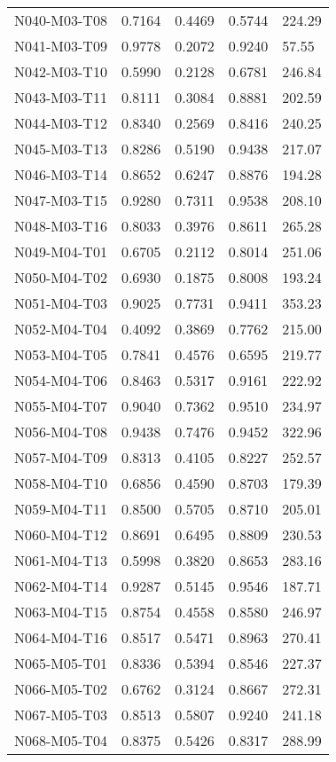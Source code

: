 \begin{longtable}[c]{|p{8cm}|c|l|l|l|}
N040-M03-T08 & 0.7164 & 0.4469 & 0.5744 & 224.29 \\
N041-M03-T09 & 0.9778 & 0.2072 & 0.9240 & 57.55 \\
N042-M03-T10 & 0.5990 & 0.2128 & 0.6781 & 246.84 \\
N043-M03-T11 & 0.8111 & 0.3084 & 0.8881 & 202.59 \\
N044-M03-T12 & 0.8340 & 0.2569 & 0.8416 & 240.25 \\
N045-M03-T13 & 0.8286 & 0.5190 & 0.9438 & 217.07 \\
N046-M03-T14 & 0.8652 & 0.6247 & 0.8876 & 194.28 \\
N047-M03-T15 & 0.9280 & 0.7311 & 0.9538 & 208.10 \\
N048-M03-T16 & 0.8033 & 0.3976 & 0.8611 & 265.28 \\
N049-M04-T01 & 0.6705 & 0.2112 & 0.8014 & 251.06 \\
N050-M04-T02 & 0.6930 & 0.1875 & 0.8008 & 193.24 \\
N051-M04-T03 & 0.9025 & 0.7731 & 0.9411 & 353.23 \\
N052-M04-T04 & 0.4092 & 0.3869 & 0.7762 & 215.00 \\
N053-M04-T05 & 0.7841 & 0.4576 & 0.6595 & 219.77 \\
N054-M04-T06 & 0.8463 & 0.5317 & 0.9161 & 222.92 \\
N055-M04-T07 & 0.9040 & 0.7362 & 0.9510 & 234.97 \\
N056-M04-T08 & 0.9438 & 0.7476 & 0.9452 & 322.96 \\
N057-M04-T09 & 0.8313 & 0.4105 & 0.8227 & 252.57 \\
N058-M04-T10 & 0.6856 & 0.4590 & 0.8703 & 179.39 \\
N059-M04-T11 & 0.8500 & 0.5705 & 0.8710 & 205.01 \\
N060-M04-T12 & 0.8691 & 0.6495 & 0.8809 & 230.53 \\
N061-M04-T13 & 0.5998 & 0.3820 & 0.8653 & 283.16 \\
N062-M04-T14 & 0.9287 & 0.5145 & 0.9546 & 187.71 \\
N063-M04-T15 & 0.8754 & 0.4558 & 0.8580 & 246.97 \\
N064-M04-T16 & 0.8517 & 0.5471 & 0.8963 & 270.41 \\
N065-M05-T01 & 0.8336 & 0.5394 & 0.8546 & 227.37 \\
N066-M05-T02 & 0.6762 & 0.3124 & 0.8667 & 272.31 \\
N067-M05-T03 & 0.8513 & 0.5807 & 0.9240 & 241.18 \\
N068-M05-T04 & 0.8375 & 0.5426 & 0.8317 & 288.99 \\

\end{longtable}

